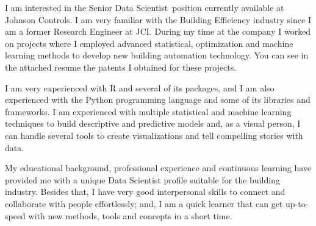 \documentclass[11pt, letterpaper]{awesome-cv}
\newcommand{\openPosition}{Senior Data Scientist}
\newcommand{\company}{Johnson Controls}
\begin{document}
\makecvheader[R]


\makelettertitle

\begin{cvletter}


I am interested in the \openPosition~position currently available at \company. I am very familiar with the Building Efficiency industry since I am a former Research Engineer at JCI. During my time at the company I worked on projects where I employed advanced statistical, optimization and machine learning methods to develop new building automation technology. You can see in the attached resume the patents I obtained for these projects.

I am very experienced with R and several of its packages, and I am also experienced with the Python programming language and some of its libraries and frameworks. I am experienced with multiple statistical and machine learning techniques to build descriptive and predictive models and, as a visual person, I can handle several tools to create visualizations and tell compelling stories with data.

My educational background, professional experience and continuous learning have provided me with a unique Data Scientist profile suitable for the building industry. Besides that, I have very good interpersonal skills to connect and collaborate with people effortlessly; and, I am a quick learner that can get up-to-speed with new methods, tools and concepts in a short time.



\end{cvletter}
\end{document}
